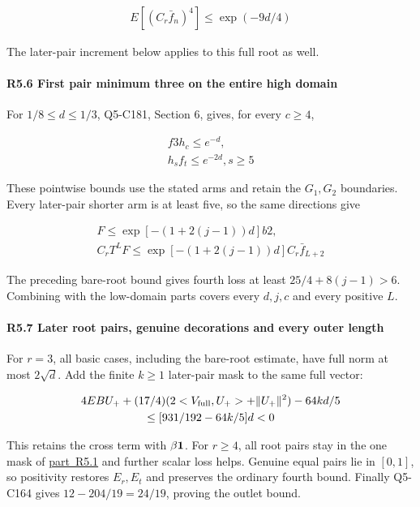 \[
\begin{gathered}
E[(C_r \bar f_n)^4]\le \exp(-9d/4) 
\end{gathered}\tag{R5.5.1}
\]

The later-pair increment below applies to this full root as well.

\paragraph{R5.6 First pair minimum three on the entire high domain}

For \(1/8\le d\le1/3\), Q5-C181, Section 6, gives, for every \(c\ge4\),

\[
\begin{gathered}
f3 h_c\le e^{-d},\\
h_s f_t\le e^{-2d},s\ge 5
\end{gathered}
\]

These pointwise bounds use the stated arms and retain the \(G_1,\allowbreak \allowbreak  G_2\) boundaries. Every later-pair shorter arm is at least five, so the same directions give

\[
\begin{gathered}
F\le \exp[-(1+2(j-1))d] b2,\\
C_r T^LF\le \exp[-(1+2(j-1))d] C_r \bar f_{L+2}
\end{gathered}
\]

The preceding bare-root bound gives fourth loss at least \(25/4+8(j-1)>6\). Combining with the low-domain parts covers every \(d,\allowbreak \allowbreak  j,\allowbreak \allowbreak  c\) and every positive \(L\).

\paragraph{R5.7 Later root pairs, genuine decorations and every outer length}\label{part:R5.7}

For \(r=3\), all basic cases, including the bare-root estimate, have full norm at most \(2\sqrt d\). Add the finite \(k\ge1\) later-pair mask to the same full vector:

\[
\begin{gathered}
4EBU_+ +(17/4)(2<V_{\rm full},U_+>+\|U_+\|^2)-64kd/5\\
\le [931/192-64k/5]d<0
\end{gathered}
\]

This retains the cross term with \(\beta\mathbf1\). For \(r\ge4\), all root pairs stay in the one mask of \mbox{\hyperref[part:R5.1]{part R5.1}} and further scalar loss helps. Genuine equal pairs lie in \([0,\allowbreak \allowbreak  1]\), so positivity restores \(E_r,\allowbreak \allowbreak  E_t\) and preserves the ordinary fourth bound. Finally Q5-C164 gives \(12-204/19=24/19\), proving the outlet bound.

